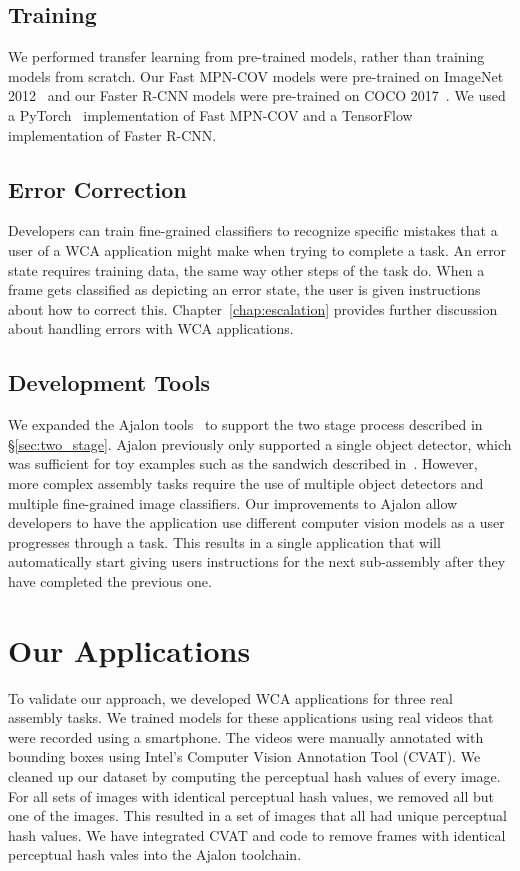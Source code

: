\subsection{Training}

We performed transfer learning from pre-trained models, rather than training
models from scratch.
Our Fast MPN-COV models were pre-trained on ImageNet 2012~\cite{ILSVRC15} and
our Faster R-CNN models were pre-trained on COCO 2017~\cite{coco}.
We used a PyTorch~\cite{pytorch} implementation of Fast MPN-COV and a
TensorFlow~\cite{tensorflow2015-whitepaper} implementation of Faster R-CNN.

\subsection{Error Correction}

Developers can train fine-grained classifiers to recognize specific mistakes
that a user of a WCA application might make when trying to complete a task.
An error state requires training data, the same way other steps of the task do.
When a frame gets classified as depicting an error state, the user is given
instructions about how to correct this.
Chapter~\ref{chap:escalation} provides further discussion about handling errors
with WCA applications.

\subsection{Development Tools}

We expanded the Ajalon tools~\cite{pham2021ajalon} to support the two stage
process described in \S\ref{sec:two_stage}.
Ajalon previously only supported a single object detector, which was sufficient
for toy examples such as the sandwich described in~\cite{chen2017}.
However, more complex assembly tasks require the use of multiple object
detectors and multiple fine-grained image classifiers.
Our improvements to Ajalon allow developers to have the application use
different computer vision models as a user progresses through a task.
This results in a single application that will automatically start
giving users instructions for the next sub-assembly after they have completed
the previous one.

\section{Our Applications}

To validate our approach, we developed WCA applications for three real assembly
tasks.
We trained models for these applications using real videos that were recorded
using a smartphone.
The videos were manually annotated with bounding boxes using Intel's Computer
Vision Annotation Tool (CVAT).
We cleaned up our dataset by computing the perceptual hash values of every
image.
For all sets of images with identical perceptual hash values, we removed all but
one of the images.
This resulted in a set of images that all had unique perceptual hash values.
We have integrated CVAT and code to remove frames with identical perceptual hash
vales into the Ajalon toolchain.


